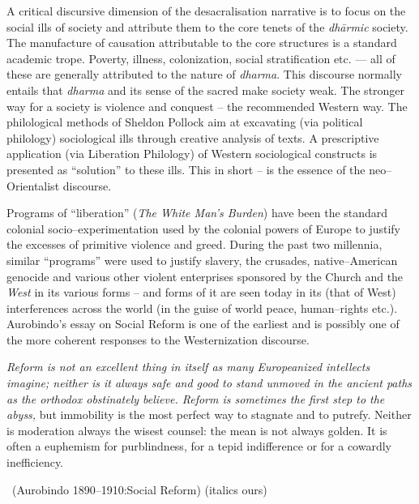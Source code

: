 A critical discursive dimension of the desacralisation narrative is to focus on the social ills of society and attribute them to the core tenets of the \textit{dhārmic} society. The manufacture of causation attributable to the core structures is a standard academic trope. Poverty, illness, colonization, social stratification etc. — all of these are generally attributed to the nature of \textit{dharma}. This discourse normally entails that \textit{dharma} and its sense of the sacred make society weak. The stronger way for a society is violence and conquest – the recommended Western way. The philological methods of Sheldon Pollock aim at excavating (via political philology) sociological ills through creative analysis of texts. A prescriptive application (via Liberation Philology) of Western sociological constructs is presented as “solution” to these ills. This in short – is the essence of the neo–Orientalist discourse.

Programs of “liberation” (\textit{The White Man's Burden}) have been the standard colonial socio–experimentation used by the colonial powers of Europe to justify the excesses of primitive violence and greed. During the past two millennia, similar “programs” were used to justify slavery, the crusades, native–American genocide and various other violent enterprises sponsored by the Church and the \textit{West} in its various forms – and forms of it are seen today in its (that of West) interferences across the world (in the guise of world peace, human–rights etc.). Aurobindo's essay on Social Reform is one of the earliest and is possibly one of the more coherent responses to the Westernization discourse.

\begin{myquote}
\textit{Reform is not an excellent thing in itself as many Europeanized intellects imagine; neither is it always safe and good to stand unmoved in the ancient paths as the orthodox obstinately believe. Reform is sometimes the first step to the abyss,} but immobility is the most perfect way to stagnate and to putrefy. Neither is moderation always the wisest counsel: the mean is not always golden. It is often a euphemism for purblindness, for a tepid indifference or for a cowardly inefficiency. 

~\hfill (Aurobindo 1890–1910:Social Reform) (italics ours)
\end{myquote}

